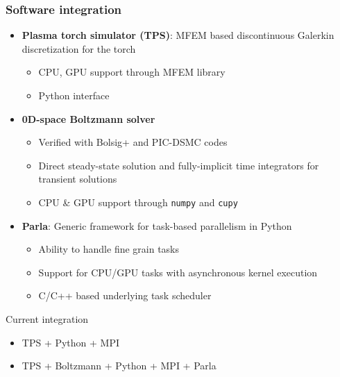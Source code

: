 \documentclass[mathserif, aspectratio=169]{beamer}
\begin{document}
\begin{frame}
	\frametitle{Software integration}
	\begin{itemize}
		\item \textbf{Plasma torch simulator (TPS)}: MFEM based discontinuous Galerkin discretization for the torch
		\begin{itemize}
			\item CPU, GPU support through MFEM library
			\item Python interface
		\end{itemize}
		\item \textbf{0D-space Boltzmann solver}
		\begin{itemize}
			\item Verified with Bolsig+ and PIC-DSMC codes
			\item Direct steady-state solution and fully-implicit time integrators for transient solutions
			\item CPU \& GPU support through \texttt{numpy} and \texttt{cupy}
		\end{itemize}
		\item \textbf{Parla}: Generic framework for task-based parallelism in Python
			\begin{itemize}
			\item Ability to handle fine grain tasks
			\item Support for CPU/GPU tasks with asynchronous kernel execution
			\item C/C++ based underlying task scheduler
			\end{itemize}
	\end{itemize}
	Current integration
	\begin{itemize}
		\item TPS + Python + MPI
		\item TPS + Boltzmann + Python + MPI + Parla
	\end{itemize}
	
\end{frame}
\end{document}
